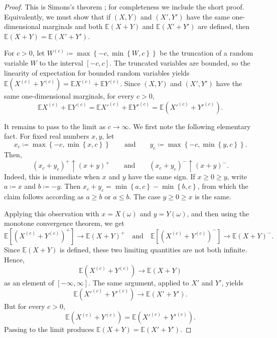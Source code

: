 \documentclass[11pt]{amsart}
\theoremstyle{plain}
\theoremstyle{definition}
\theoremstyle{remark}
\numberwithin{equation}{section}
\newcommand{\E}{\mathbb E}
\newcommand{\1}{\mathbf 1}
\begin{document}
\begin{proof}
This is Simons's theorem \cite[Theorem, p.~157]{Simons1977Unexpected}; for completeness we include the short proof. Equivalently, we must show that if \(\left(X,Y\right)\) and \(\left(X',Y'\right)\) have the same one-dimensional marginals and both \(\E\left(X+Y\right)\) and \(\E\left(X'+Y'\right)\) are defined, then \(\E\left(X+Y\right)=\E\left(X'+Y'\right)\).

For \(c>0\), let \(W^{\left(c\right)}\coloneqq\max\left\{-c,\min\left\{W,c\right\}\right\}\) be the truncation of a random variable \(W\) to the interval \(\left[-c,c\right]\). The truncated variables are bounded, so the linearity of expectation for bounded random variables yields \(\E\left(X^{\left(c\right)}+Y^{\left(c\right)}\right)=\E X^{\left(c\right)}+\E Y^{\left(c\right)}\). Since \(\left(X,Y\right)\) and \(\left(X',Y'\right)\) have the same one-dimensional marginals, for every \(c>0\),
\[
\E X^{\left(c\right)}+\E Y^{\left(c\right)}=\E {X'}^{\left(c\right)}+\E {Y'}^{\left(c\right)}=\E\left({X'}^{\left(c\right)}+{Y'}^{\left(c\right)}\right).
\]

It remains to pass to the limit as \(c\to\infty\). We first note the following elementary fact. For fixed real numbers \(x,y\), let
\[
x_c\coloneqq\max\left\{-c,\min\left\{x,c\right\}\right\}
\qquad \text{and} \qquad
y_c\coloneqq\max\left\{-c,\min\left\{y,c\right\}\right\}.
\]
Then,
\[
\left(x_c+y_c\right)^+\uparrow\left(x+y\right)^+
\qquad \text{and} \qquad
\left(x_c+y_c\right)^-\uparrow\left(x+y\right)^-.
\]
Indeed, this is immediate when \(x\) and \(y\) have the same sign. If
\(x\ge0\ge y\), write \(a\coloneqq x\) and \(b\coloneqq-y\). Then
\(x_c+y_c=\min\left\{a,c\right\}-\min\left\{b,c\right\}\), from which the claim follows according as \(a\ge b\) or \(a\le b\). The case \(y\ge0\ge x\) is the same.

Applying this observation with \(x=X\left(\omega\right)\) and
\(y=Y\left(\omega\right)\), and then using the monotone convergence theorem, we get
\[
\E\left[\left(X^{\left(c\right)}+Y^{\left(c\right)}\right)^+\right]
\to
\E\left(X+Y\right)^+
\quad \text{and} \quad
\E\left[\left(X^{\left(c\right)}+Y^{\left(c\right)}\right)^-\right]
\to
\E\left(X+Y\right)^-.
\]
Since \(\E\left(X+Y\right)\) is defined, these two limiting quantities are not
both infinite. Hence,
\[
\E\left(X^{\left(c\right)}+Y^{\left(c\right)}\right)
\to
\E\left(X+Y\right)
\]
as an element of \(\left[-\infty,\infty\right]\). The same argument, applied
to \(X'\) and \(Y'\), yields
\[
\E\left({X'}^{\left(c\right)}+{Y'}^{\left(c\right)}\right)
\to
\E\left(X'+Y'\right).
\]
But for every \(c>0\),
\[
\E\left(X^{\left(c\right)}+Y^{\left(c\right)}\right)
=
\E\left({X'}^{\left(c\right)}+{Y'}^{\left(c\right)}\right).
\]
Passing to the limit produces \(\E\left(X+Y\right)=\E\left(X'+Y'\right)\).\end{proof}
\end{document}
